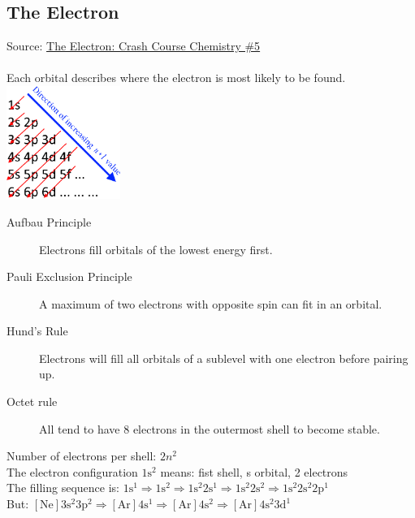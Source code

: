 \subsection{The Electron}
Source: \href{https://www.youtube.com/watch?v=rcKilE9CdaA&list=PL8dPuuaLjXtPHzzYuWy6fYEaX9mQQ8oGr&index=6}{The Electron: Crash Course Chemistry \#5}
\\\\
Each orbital describes where the electron is most likely to be found.
\\
\includegraphics[width=10em]{./includes/chemistry/imgs/Aufbau_Principle.png}

\begin{description}
    \item[Aufbau Principle] Electrons fill orbitals of the lowest energy first.
    \item[Pauli Exclusion Principle] A maximum of two electrons with opposite spin can fit in an orbital.
    \item[Hund's Rule] Electrons will fill all orbitals of a sublevel with one electron before pairing up.
    \item[Octet rule] All tend to have 8 electrons in the outermost shell to become stable.
\end{description}
%
Number of electrons per shell: $2n^2$\\ 
The electron configuration $1\text{s}^2$ means: fist shell, s orbital, 2 electrons\\
The filling sequence is: $1\text{s}^1 \Rightarrow 1\text{s}^2 \Rightarrow 
1\text{s}^2 2\text{s}^1 \Rightarrow 1\text{s}^2 2\text{s}^ 2\Rightarrow 
1\text{s}^2 2\text{s}^2 2\text{p}^1$\\
But: $[\text{Ne}] 3\text{s}^2 3\text{p}^2 \Rightarrow [\text{Ar}] 4\text{s}^1 
\Rightarrow [\text{Ar}] 4\text{s}^2 \Rightarrow [\text{Ar}] 4\text{s}^2 3\text{d}^1$